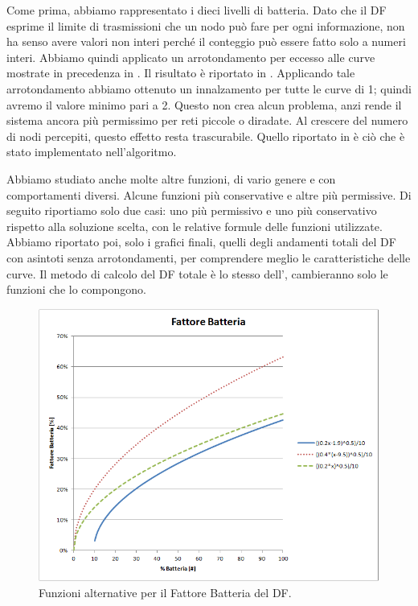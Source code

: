 Come prima, abbiamo rappresentato i dieci livelli di batteria. Dato che il \acs{DF} esprime il limite di trasmissioni che un nodo può fare per ogni informazione, non ha senso avere valori non interi perché il conteggio può essere fatto solo a numeri interi. Abbiamo quindi applicato un arrotondamento per eccesso alle curve mostrate in precedenza in . Il risultato è riportato in . Applicando tale arrotondamento abbiamo ottenuto un innalzamento per tutte le curve di 1; quindi avremo il valore minimo pari a 2. Questo non crea alcun problema, anzi rende il sistema ancora più permissimo per reti piccole o diradate. Al crescere del numero di nodi percepiti, questo effetto resta trascurabile. Quello riportato in  è ciò che è stato implementato nell'algoritmo.

Abbiamo studiato anche molte altre funzioni, di vario genere e con comportamenti diversi. Alcune funzioni più conservative e altre più permissive. Di seguito riportiamo solo due casi: uno più permissivo e uno più conservativo rispetto alla soluzione scelta, con le relative formule delle funzioni utilizzate. Abbiamo riportato poi, solo i grafici finali, quelli degli andamenti totali del \acs{DF} con asintoti senza arrotondamenti, per comprendere meglio le caratteristiche delle curve. Il metodo di calcolo del \acs{DF} totale è lo stesso dell',  cambieranno solo le funzioni che lo compongono.
\begin{figure}[t]
	\centering
	\includegraphics[width=0.9\linewidth]{Images/grafici_usati/DF_battery_factor_perm_conserv}
	\caption[Fattore Batteria alternative del DF]{Funzioni alternative per il Fattore Batteria del \acs{DF}.}
	\label{fig:DF_battery_factor_perm_conserv}
\end{figure}

